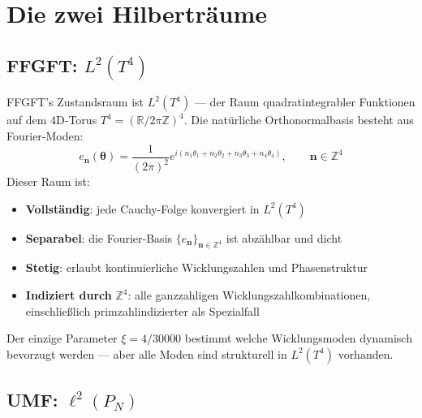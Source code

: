 \clearpage

\section{Die zwei Hilberträume}

\subsection{FFGFT: \texorpdfstring{$L^2(T^4)$}{L2(T4)}}

FFGFT's Zustandsraum ist $L^2(T^4)$ — der Raum quadratintegrabler Funktionen
auf dem 4D-Torus $T^4 = (\mathbb{R}/2\pi\mathbb{Z})^4$. Die natürliche
Orthonormalbasis besteht aus Fourier-Moden:
\begin{equation}
  e_{\mathbf{n}}(\symbf{\theta}) = \frac{1}{(2\pi)^2}
  e^{i(n_1\theta_1 + n_2\theta_2 + n_3\theta_3 + n_4\theta_4)},
  \qquad \mathbf{n} \in \mathbb{Z}^4
  \tag{244.1}
\end{equation}
Dieser Raum ist:
\begin{itemize}
  \item \textbf{Vollständig}: jede Cauchy-Folge konvergiert in $L^2(T^4)$
  \item \textbf{Separabel}: die Fourier-Basis $\{e_{\mathbf{n}}\}_{\mathbf{n}\in\mathbb{Z}^4}$
    ist abzählbar und dicht
  \item \textbf{Stetig}: erlaubt kontinuierliche Wicklungszahlen und Phasenstruktur
  \item \textbf{Indiziert durch} $\mathbb{Z}^4$: alle ganzzahligen Wicklungszahlkombinationen,
    einschließlich primzahlindizierter als Spezialfall
\end{itemize}

Der einzige Parameter $\xi = 4/30000$ bestimmt welche Wicklungsmoden dynamisch
bevorzugt werden — aber alle Moden sind strukturell in $L^2(T^4)$ vorhanden.

\subsection{UMF: \texorpdfstring{$\ell^2(P_N)$}{ell2(P\_N)}}


